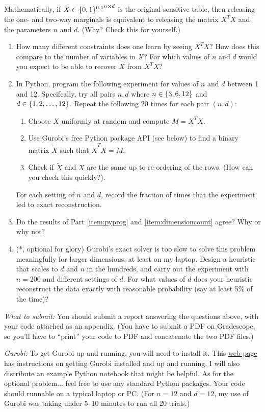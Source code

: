\documentclass[11pt]{article}
\begin{document}
\begin{enumerate}[leftmargin=\parindent, itemsep=3ex]
  Mathematically, if $X \in {\{0,1\}^{0,1}}^{n\times d}$ is the original sensitive table, then releasing the one- and two-way marginals is equivalent to releasing the matrix $X^T X$ and the parameters $n$ and $d$. (Why? Check this for yourself.)
  \begin{enumerate}
    \item \label{item:dimensioncount} How many different constraints does one learn by seeing $X^T X$? How does this compare to the number of variables in $X$? For which values of $n$ and $d$ would you expect to be able to recover $X$ from $X^T X$? 

    \item\label{item:pyprog} In Python, program the following experiment for values of $n$ and $d$ between 1 and 12. Specifcally, try all pairs $n,d$ where $n\in \left\{ 3,6, 12 \right\}$ and $d \in \left\{ 1,2,\dots,12 \right\}$. Repeat the following 20 times for each pair $(n,d)$: 
    \begin{enumerate}
      \item Choose $X$ uniformly at random and compute $M = X^T X$.
      \item Use Gurobi's free Python package API (see below) to find a binary matrix $\tilde X$  such that $\tilde X^T \tilde X = M$.
      \item Check if $\tilde X$ and $X$ are the same up to re-ordering of the rows. (How can you check this quickly?).
    \end{enumerate}
    For each setting of $n$ and $d$, record the fraction of times that the experiment led to exact reconstruction. 
    \item Do the results of Part \ref{item:pyprog} and \ref{item:dimensioncount} agree? Why or why not?
    \item (*, optional for glory) Gurobi's exact solver is too slow to solve this problem meaningfully for larger dimensions, at least on my laptop. Design a heuristic that scales to $d$ and $n$ in the hundreds, and carry out the experiment with $n=200$ and different settings of $d$. For what values of $d$ does your heuristic reconstruct the data exactly with reasonable probability (say at least 5\% of the time)?  
  \end{enumerate}
  
  \emph{What to submit:} You should submit a report answering the questions above, with your code attached as an appendix. (You have to submit a PDF on Gradescope, so you'll have to ``print'' your code to PDF and concatenate the two PDF files.)

  \emph{Gurobi:} To get Gurobi up and running, you will need to install it. This \href{https://support.gurobi.com/hc/en-us/articles/17278438215313-Tutorial-Getting-Started-with-the-Gurobi-Python-API}{web page} has instructions on getting Gurobi installed and up and running. I will also distribute an example Python notebook that might be helpful. 
  As for the optional problem... feel free to use any standard Python packages. Your code should runnable on a typical laptop or PC. (For $n=12$ and $d=12$, my use of Gurobi was taking under 5--10 minutes to run all 20 trials.)
\end{enumerate}
\end{document}
